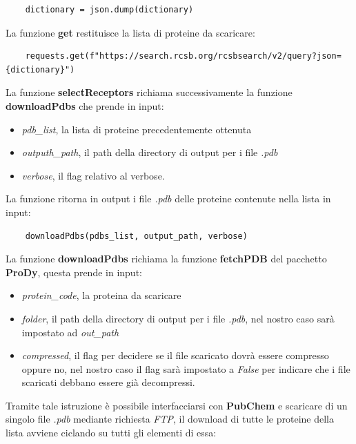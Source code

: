 \begin{verbatim}
    dictionary = json.dump(dictionary)
\end{verbatim}

La funzione \textbf{get} restituisce la lista di proteine da scaricare:

\begin{verbatim}
    requests.get(f"https://search.rcsb.org/rcsbsearch/v2/query?json={dictionary}")
\end{verbatim}

La funzione \textbf{selectReceptors} richiama successivamente la funzione \textbf{downloadPdbs} che prende in input:

\begin{itemize}
    \item \textit{pdb\_list}, la lista di proteine precedentemente ottenuta
    \item \textit{outputh\_path}, il path della directory di output per i file \textit{.pdb}
    \item \textit{verbose}, il flag relativo al verbose.
\end{itemize}

La funzione ritorna in output i file \textit{.pdb} delle proteine contenute nella lista in input:

\begin{verbatim}
    downloadPdbs(pdbs_list, output_path, verbose)
\end{verbatim}

La funzione \textbf{downloadPdbs} richiama la funzione \textbf{fetchPDB} del pacchetto \textbf{ProDy}, questa prende in input:

\begin{itemize}
    \item \textit{protein\_code}, la proteina da scaricare
    \item \textit{folder}, il path della directory di output per i file \textit{.pdb}, nel nostro caso sarà impostato ad \textit{out\_path}
    \item \textit{compressed}, il flag per decidere se il file scaricato dovrà essere compresso oppure no, nel nostro caso il flag sarà impostato a \textit{False} per indicare che i file scaricati debbano essere già decompressi.
\end{itemize}

Tramite tale istruzione è possibile interfacciarsi con \textbf{PubChem} e scaricare di un singolo file \textit{.pdb} mediante richiesta \textit{FTP}, il download di tutte le proteine della lista avviene ciclando su tutti gli elementi di essa:

